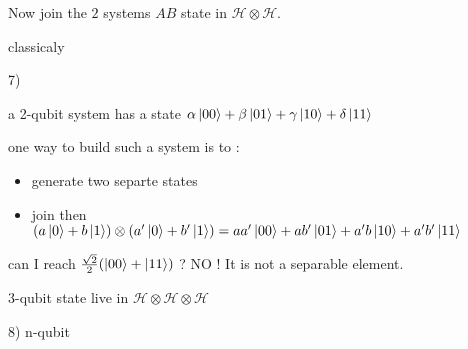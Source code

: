 \documentclass{article}
\begin{document}
    Now join the $2$ systems $A B$ state in $\mathcal{H} \otimes \mathcal{H}$.

    classicaly

    7)

    a 2-qubit system has a state
    $\alpha \ket{00} + \beta \ket{01} + \gamma \ket{10} + \delta \ket{11} $

    one way to build such a system is to :

    \begin{itemize}
      \item generate two separte states

      \item join then $(a \ket 0 + b \ket 1) \otimes (a' \ket 0 + b' \ket 1)=
        aa' \ket{00} + ab' \ket{01} + a'b \ket{10} + a'b' \ket{11}$
    \end{itemize}

    can I reach $\frac{\sqrt{2}}{2}(\ket{00} + \ket{11})$ ? NO ! It is not a
    separable element.

    \vspace{5mm}

    3-qubit state live in $\mathcal{H} \otimes \mathcal{H} \otimes \mathcal{H}$

    8)
    n-qubit
\end{document}
